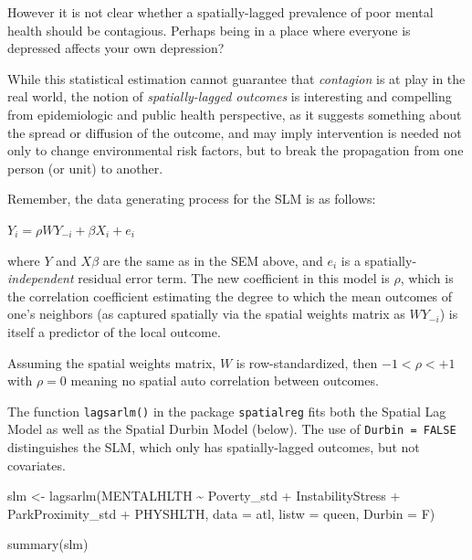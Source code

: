 \documentclass[
]{book}
\newenvironment{Shaded}{\begin{snugshade}}{\end{snugshade}}
\newcommand{\AttributeTok}[1]{\textcolor[rgb]{0.77,0.63,0.00}{#1}}
\newcommand{\FunctionTok}[1]{\textcolor[rgb]{0.00,0.00,0.00}{#1}}
\newcommand{\NormalTok}[1]{#1}
\newcommand{\OtherTok}[1]{\textcolor[rgb]{0.56,0.35,0.01}{#1}}
\newcommand{\SpecialCharTok}[1]{\textcolor[rgb]{0.00,0.00,0.00}{#1}}
\begin{document}
However it is not clear whether a spatially-lagged prevalence of poor mental health should be contagious. Perhaps being in a place where everyone is depressed affects your own depression?

While this statistical estimation cannot guarantee that \emph{contagion} is at play in the real world, the notion of \emph{spatially-lagged outcomes} is interesting and compelling from epidemiologic and public health perspective, as it suggests something about the spread or diffusion of the outcome, and may imply intervention is needed not only to change environmental risk factors, but to break the propagation from one person (or unit) to another.

Remember, the data generating process for the SLM is as follows:

\(Y_i=\rho WY_{-i}+\beta X_i+e_i\)

where \(Y\) and \(X\beta\) are the same as in the SEM above, and \(e_i\) is a spatially-\emph{independent} residual error term. The new coefficient in this model is \(\rho\), which is the correlation coefficient estimating the degree to which the mean outcomes of one's neighbors (as captured spatially via the spatial weights matrix as \(WY_{-i}\)) is itself a predictor of the local outcome.

Assuming the spatial weights matrix, \(W\) is row-standardized, then \(-1<\rho<+1\) with \(\rho=0\) meaning no spatial auto correlation between outcomes.

The function \texttt{lagsarlm()} in the package \texttt{spatialreg} fits both the Spatial Lag Model as well as the Spatial Durbin Model (below). The use of \texttt{Durbin\ =\ FALSE} distinguishes the SLM, which only has spatially-lagged outcomes, but not covariates.

\begin{Shaded}
\begin{Highlighting}[]
\NormalTok{slm }\OtherTok{\textless{}{-}} \FunctionTok{lagsarlm}\NormalTok{(MENTALHLTH }\SpecialCharTok{\textasciitilde{}}\NormalTok{ Poverty\_std }\SpecialCharTok{+}\NormalTok{ InstabilityStress }\SpecialCharTok{+}\NormalTok{ ParkProximity\_std  }\SpecialCharTok{+}\NormalTok{ PHYSHLTH,}
                \AttributeTok{data =}\NormalTok{ atl,}
                \AttributeTok{listw =}\NormalTok{ queen,}
                \AttributeTok{Durbin =}\NormalTok{ F)}

\FunctionTok{summary}\NormalTok{(slm)}
\end{Highlighting}
\end{Shaded}
\end{document}
